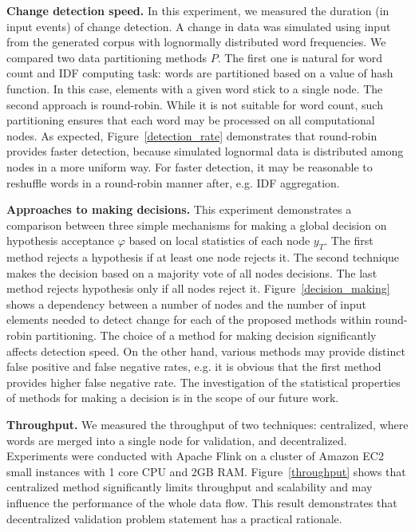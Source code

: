 {\bf Change detection speed.} In this experiment, we measured the duration (in input events) of change detection. A change in data was simulated using input from the generated corpus with lognormally distributed word frequencies. We compared two data partitioning methods $P$. The first one is natural for word count and IDF computing task: words are partitioned based on a value of hash function. In this case, elements with a given word stick to a single node. The second approach is round-robin. While it is not suitable for word count, such partitioning ensures that each word may be processed on all computational nodes. As expected, Figure~\ref{detection_rate} demonstrates that round-robin provides faster detection, because simulated lognormal data is distributed among nodes in a more uniform way. For faster detection, it may be reasonable to reshuffle words in a round-robin manner after, e.g. IDF aggregation.

{\bf Approaches to making decisions.} This experiment demonstrates a comparison between three simple mechanisms for making a global decision on hypothesis acceptance $\varphi$ based on local statistics of each node $y_T$. The first method rejects a hypothesis if at least one node rejects it. The second technique makes the decision based on a majority vote of all nodes decisions. The last method rejects hypothesis only if all nodes reject it. Figure~\ref{decision_making} shows a dependency between a number of nodes and the number of input elements needed to detect change for each of the proposed methods within round-robin partitioning. The choice of a method for making decision significantly affects detection speed. On the other hand, various methods may provide distinct false positive and false negative rates, e.g. it is obvious that the first method provides higher false negative rate. The investigation of the statistical properties of methods for making a decision is in the scope of our future work.

{\bf Throughput.} We measured the throughput of two techniques: centralized, where words are merged into a single node for validation, and decentralized. Experiments were conducted with Apache Flink on a cluster of Amazon EC2 small instances with 1 core CPU and 2GB RAM. Figure~\ref{throughput} shows that centralized method significantly limits throughput and scalability and may influence the performance of the whole data flow. This result demonstrates that decentralized validation problem statement has a practical rationale.